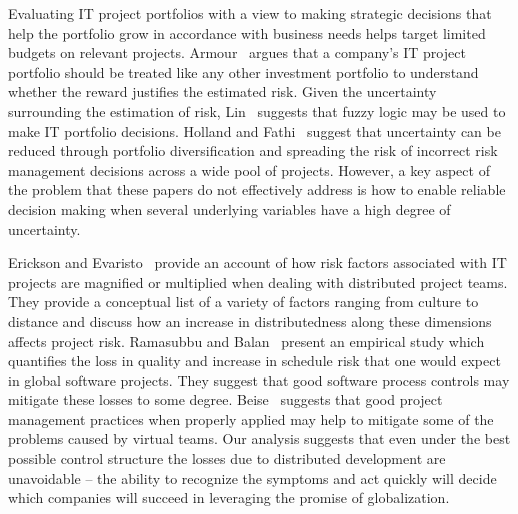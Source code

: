 Evaluating IT project portfolios with a view to making strategic decisions that help the portfolio grow in accordance with business needs helps target limited budgets on relevant projects. Armour~\cite{risk18} argues that a company’s IT project portfolio should be treated like any other investment portfolio to understand whether the reward justifies the estimated risk. Given the uncertainty surrounding the estimation of risk, Lin~\cite{risk20} suggests that fuzzy logic may be used to make IT portfolio decisions. Holland and Fathi~\cite{risk25} suggest that uncertainty can be reduced through portfolio diversification and spreading the risk of incorrect risk management decisions across a wide pool of projects. However, a key aspect of the problem that these papers do not effectively address is how to enable reliable decision making when several underlying variables have a high degree of uncertainty.

Erickson and Evaristo~\cite{risk22} provide an account of how risk factors associated with IT projects are magnified or multiplied when dealing with distributed project teams.  They provide a conceptual list of a variety of factors ranging from culture to distance and discuss how an increase in distributedness along these dimensions affects project risk.  Ramasubbu and Balan~\cite{risk23} present an empirical study which quantifies the loss in quality and increase in schedule risk that one would expect in global software projects. They suggest that good software process controls may mitigate these losses to some degree. Beise~\cite{risk24} suggests that good project management practices when properly applied may help to mitigate some of the problems caused by virtual teams. Our analysis suggests that even under the best possible control structure the losses due to distributed development are unavoidable -- the ability to recognize the symptoms and act quickly will decide which  companies will succeed in leveraging the promise of globalization.


